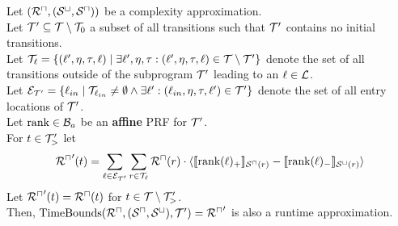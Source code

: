 \begin{theorem}[TimeBounds]
  Let $({\mathcal{R}^\sqcap}, {({\mathcal{S}^\sqcup}, {\mathcal{S}^\sqcap})})$ be a complexity approximation. \\
  Let $\mathcal{T}' \subseteq \mathcal{T} \setminus \mathcal{T}_0$ a subset of all transitions such that $\mathcal{T}'$ contains no initial transitions. \\
  Let $\mathcal{T}_{\ell} = \lbrace (\ell', \eta, \tau, \ell) \mid \exists \ell', \eta, \tau: (\ell', \eta, \tau, \ell) \in \mathcal{T} \setminus \mathcal{T}' \rbrace$ denote the set of all transitions outside of the subprogram $\mathcal{T}'$ leading to an $\ell \in \mathcal{L}$. \\
  Let $\mathcal{E}_{\mathcal{T}'} = \lbrace \ell_{in} \mid \mathcal{T}_{\ell_{in}} \neq \emptyset \wedge \exists \ell': (\ell_{in}, \eta, \tau, \ell') \in \mathcal{T}' \rbrace$ denote the set of all entry locations of $\mathcal{T}'$. \\
  Let $\text{rank} \in \mathcal{B}_a$ be an \textbf{affine} PRF for $\mathcal{T}'$. \\
  For $t \in \mathcal{T}'_>$ let
  \[ {\mathcal{R}^\sqcap}'(t) = \sum_{\ell \in \mathcal{E}_{\mathcal{T}'}} \sum_{r \in \mathcal{T}_\ell} {\mathcal{R}^\sqcap}(r) \cdot \langle\llbracket \text{rank}(\ell)_+ \rrbracket_{{\mathcal{S}^\sqcap}(r)} - \llbracket \text{rank}(\ell)_- \rrbracket_{{\mathcal{S}^\sqcup}(r)}\rangle \]
  Let ${\mathcal{R}^\sqcap}'(t) = {\mathcal{R}^\sqcap}(t)$ for $t \in \mathcal{T} \setminus \mathcal{T}'_>$. \\
  Then, $\text{TimeBounds}({\mathcal{R}^\sqcap}, ({\mathcal{S}^\sqcap}, {\mathcal{S}^\sqcup}), \mathcal{T}') = {\mathcal{R}^\sqcap}'$ is also a runtime approximation.
\end{theorem}

